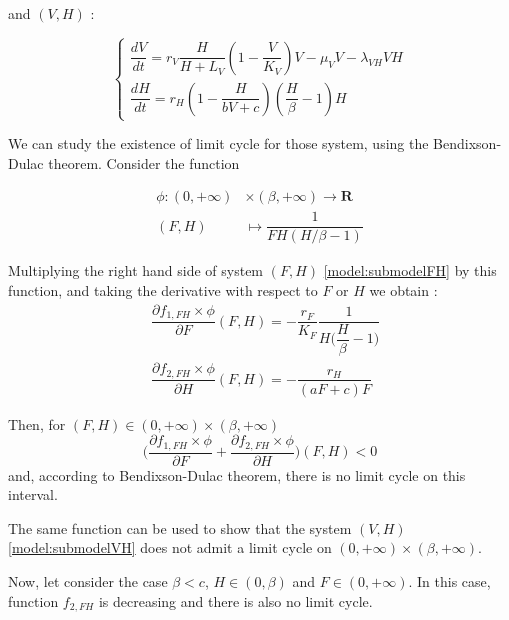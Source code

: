 \documentclass{article}
\newcommand{\lv}{\lambda_{VH}}
\begin{document}
and $(V,H)$ :

\begin{equation}    
\left\{ \begin{array}{l}
\dfrac{dV}{dt}=r_V \dfrac{H}{H + L_V} \left(1-\dfrac{V}{K_{V}}\right)V -\mu_V V -\lv V H\\
\dfrac{dH}{dt}=r_H \left(1-\dfrac{H}{bV + c} \right)  (\dfrac{H}{\beta} - 1) H
\end{array}\right.
\label{model:submodelVH}
\end{equation}

We can study the existence of limit cycle for those system, using the Bendixson-Dulac theorem. Consider the function

\begin{align}
\phi : (0, +\infty) &\times (\beta, +\infty) \rightarrow \mathbf{R} \\
\nonumber
(F,H) & \mapsto \dfrac{1}{F H (H/\beta - 1)}
\end{align}

Multiplying the right hand side of system $(F,H)$ \eqref{model:submodelFH} by this function, and taking the derivative with respect to $F$ or $H$ we obtain :
\begin{subequations}
\begin{align}
&\dfrac{\partial f_{1,FH} \times \phi}{\partial F}(F,H) = - \dfrac{r_F}{K_F} \dfrac{1}{H \big(\dfrac{H}{\beta}-1 \big)} \\
&\dfrac{\partial f_{2,FH} \times \phi}{\partial H}(F,H) = - \dfrac{r_H}{(aF + c) F}
\end{align}
\end{subequations}

Then, for $(F, H) \in (0, +\infty) \times (\beta, +\infty)$
\begin{equation}
\Big(\dfrac{\partial f_{1,FH} \times \phi}{\partial F} + \dfrac{\partial f_{2,FH} \times \phi}{\partial H}\Big) (F, H) < 0
\end{equation}
and, according to Bendixson-Dulac theorem, there is no limit cycle on this interval.

The same function can be used to show that the system $(V,H)$ \eqref{model:submodelVH} does not admit a limit cycle on $(0, +\infty) \times (\beta, +\infty)$.

Now, let consider the case $\beta < c$, $ H \in (0,\beta)$ and $F \in (0, +\infty)$. In this case, function $f_{2,FH}$  is decreasing and there is also no limit cycle.
\end{document}
